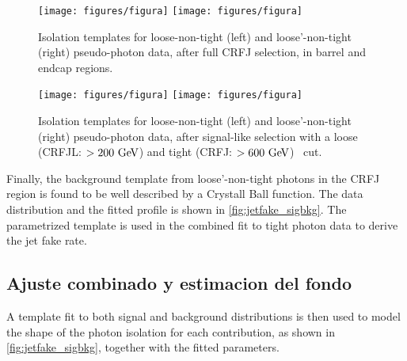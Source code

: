 \begin{figure}[h]
  \begin{center}
    \texttt{[image: figures/figura]}
    \texttt{[image: figures/figura]}
    \caption{Isolation templates for loose-non-tight (left) and loose'-non-tight (right) pseudo-photon data,
      after full CRFJ selection, in barrel and endcap regions.}
  \label{fig:jetfake_pseudo_data_BE}
  \end{center}
\end{figure}

\begin{figure}[h]
  \begin{center}
    \texttt{[image: figures/figura]}
    \texttt{[image: figures/figura]}
    \caption{Isolation templates for loose-non-tight (left) and loose'-non-tight (right) pseudo-photon data,
      after signal-like selection with a  loose (CRFJL: $>200 \gev$) and tight (CRFJ: $>600 \gev$) \HT\ cut.}
  \label{fig:jetfake_pseudo_data_LR_VR}
  \end{center}
\end{figure}

Finally, the background template from loose'-non-tight photons in the CRFJ region is found
to be well described by a Crystall Ball function. The data distribution and the fitted profile
is shown in {\fig} \ref{fig:jetfake_sigbkg}. The parametrized template is used in the combined
fit to tight photon data to derive the jet fake rate.


\subsection{Ajuste combinado y estimacion del fondo} \label{sec:jet_fake_results}

A template fit to both signal and background distributions is then used to model the shape of the photon isolation
for each contribution, as shown in {\fig} \ref{fig:jetfake_sigbkg}, together with the fitted parameters.

